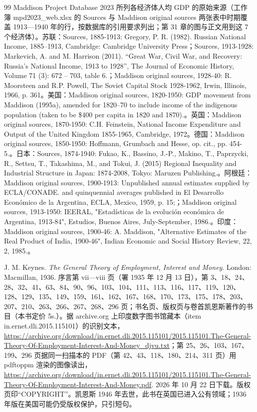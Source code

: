 \begin{thebibliography}{99}
 Maddison Project Database 2023 所列各经济体人均 GDP 的原始来源（工作簿 mpd2023\_web.xlsx 的 Sources 与 Maddison original sources 两张表中时期覆盖 1913—1940 年的行，按数据库的引用要求列出；第 31 章的图与正文用到这 7 个经济体）。苏联：Sources, 1885-1913: Gregory, P. R. (1982). Russian National Income, 1885–1913, Cambridge: Cambridge University Press；Sources, 1913-1928: Markevich, A. and M. Harrison (2011). “Great War, Civil War, and Recovery: Russia's National Income, 1913 to 1928”, The Journal of Economic History, Volume 71 (3): 672 – 703, table 6.；Maddison original sources, 1928-40: R. Moorsteen and R.P. Powell, The Soviet Capital Stock 1928-1962, Irwin, Illinois, 1966, p. 361。美国：Maddison original sources, 1820-1950: GDP movement from Maddison (1995a), amended for 1820–70 to include income of the indigenous population (taken to be \$400 per capita in 1820 and 1870).。英国：Maddison original sources, 1870-1950: C.H. Feinstein, National Income Expenditure and Output of the United Kingdom 1855-1965, Cambridge, 1972。德国：Maddison original sources, 1850-1950: Hoffmann, Grumbach and Hesse, op. cit., pp. 454-5.。日本：Sources, 1874-1940: Fukao, K., Bassino, J.-P., Makino, T., Paprzycki, R., Settsu, T., Takashima, M., and Tokui, J. (2015) Regional Inequality and Industrial Structure in Japan: 1874-2008, Tokyo: Maruzen Publishing.。阿根廷：Maddison original sources, 1900-1913: Unpublished annual estimates supplied by ECLA/CONADE. and quinquennial averages published in El Desarrollo Económico de la Argentina, ECLA, Mexico, 1959, p. 15;；Maddison original sources, 1913-1950: IEERAL, "Estadísticas de la evolución económica de Argentina, 1913-84", Estudios, Buenos Aires, July-September, 1986.。印度：Maddison original sources, 1900-46: A. Maddison, "Alternative Estimates of the Real Product of India, 1900-46", Indian Economic and Social History Review, 22, 2, 1985.。

 J. M. Keynes. \emph{The General Theory of Employment, Interest and Money}. London: Macmillan, 1936. 序言第 vii—viii 页（署 1935 年 12 月 13 日），第 3、18、24、28、32、41、63、84、90、96、103、104、111、113、116、117、119、120、128、129、135、149、159、161、162、167、168、170、173、175、178、203、207、210、263、266、267、268、296 页；书名页、版权页与卷首凯恩斯著作的书目（本书定价 5s.）。据 archive.org 上印度数字图书馆藏本（item in.ernet.dli.2015.115101）的识别文本，\url{https://archive.org/download/in.ernet.dli.2015.115101/2015.115101.The-General-Theory-Of-Employment-Interest-And-Money_djvu.txt}；第 25、26、103、167、199、296 页据同一扫描本的 PDF（第 42、43、118、180、214、311 页）用 pdftoppm 渲染的图像读出，\url{https://archive.org/download/in.ernet.dli.2015.115101/2015.115101.The-General-Theory-Of-Employment-Interest-And-Money.pdf}. 2026 年 10 月 22 日下载。版权页印“COPYRIGHT”。凯恩斯 1946 年去世，此书在英国已进入公有领域；1936 年版在美国可能仍受版权保护，只引短句。


\end{thebibliography}
